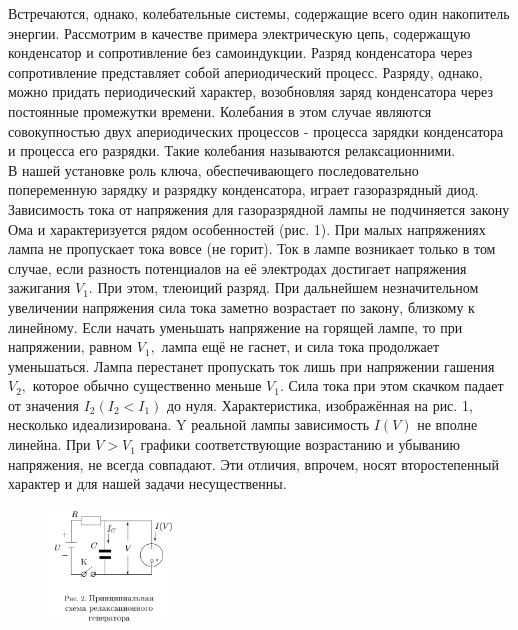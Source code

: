 \documentclass[a4paper, 12pt]{article}%
\begin{document}
Встречаются, однако, колебательные системы, содержащие всего один накопитель энергии. Рассмотрим в качестве примера электрическую цепь, содержащую конденсатор и сопротивление без самоиндукции. Разряд конденсатора через сопротивление представляет собой апериодический процесс. Разряду, однако, можно придать периодический характер, возобновляя заряд конденсатора через постоянные промежутки времени. Колебания в этом случае являются совокупностью двух апериодических процессов - процесса зарядки конденсатора и процесса его разрядки. Такие колебания называются релаксационними.\\
В нашей установке роль ключа, обеспечивающего последовательно попеременную зарядку и разрядку конденсатора, играет газоразрядный диод. Зависимость тока от напряжения для газоразрядной лампы не подчиняется закону Ома и характеризуется рядом особенностей (рис. 1). При малых напряжениях лампа не пропускает тока вовсе (не горит). Ток в лампе возникает только в том случае, если разность потенциалов на её электродах достигает напряжения зажигания $V_{1} .$ При этом, тлеюиций разряд. При дальнейшем незначительном увеличении напряжения сила тока заметно возрастает по закону, близкому к линейному. 
Если начать уменьшать напряжение на горящей лампе, то при напряжении, равном $V_{1},$ лампа ещё не гаснет, и сила тока продолжает уменьшаться. Лампа перестанет пропускать ток лишь при напряжении гашения $V_{2},$ которое обычно существенно меньше $V_{1}$. Сила тока при этом скачком падает от значения $I_{2}\left(I_{2}<I_{1}\right)$ до нуля. Характеристика, изображённая на рис. 1, несколько идеализирована. $\mathrm{Y}$ реальной лампы зависимость $I(V)$ не вполне линейна. При $V>V_{1}$ графики
соответствующие возрастанию и убыванию напряжения, не всегда совпадают. Эти отличия, впрочем, носят второстепенный характер и для нашей задачи несущественны.
 
\newpage

\begin{figure} 
\begin{center}
\includegraphics[width=0.3\textwidth]{./ann/2.PNG} 
\end{center}
\end{figure}
\end{document}
